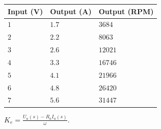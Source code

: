 \begin{table}[H]
\begin{tabular}{|l|l|l|}
\hline%
  \textbf{Input (V)}  & \textbf{Output (A)} & \textbf{Output (RPM)} \\
\hline%
  $1$                 &            $1.7$  &  $3684$                 \\
\hline%
  $2$                 &            $2.2$  &  $8063$                 \\
\hline%
  $3$                 &            $2.6$  &  $12021$                \\
\hline%
  $4$                 &            $3.3$  &  $16746$                \\
\hline%
  $5$                 &            $4.1$  &  $21966$                \\
\hline%
  $6$                 &            $4.8$  &  $26420$                \\
\hline%
  $7$                 &            $5.6$  &  $31447$                \\
\hline%
\end{tabular}
\end{table}

$K_e = \frac{U_a (s) - R_a I_a (s)}{\omega}$.
